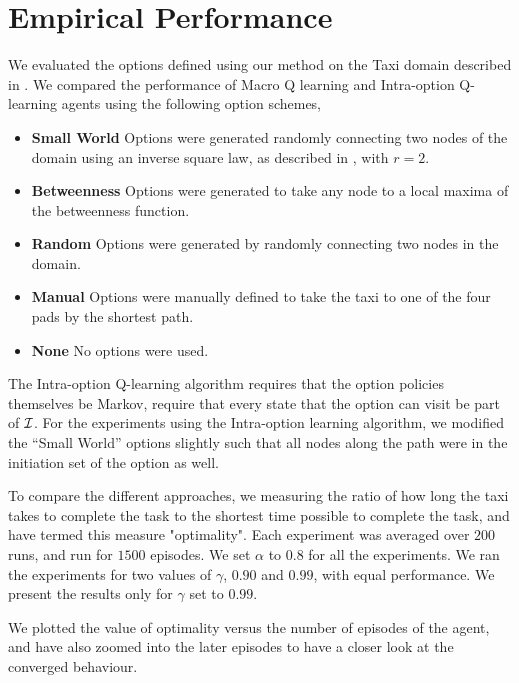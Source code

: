 \section{Empirical Performance}
\label{sec:experiments}

We evaluated the options defined using our method on the Taxi domain described
in . We compared the performance of Macro Q learning and
Intra-option Q-learning agents using the following option schemes,
\begin{itemize}
   \item \textbf{Small World} Options were generated randomly connecting two nodes of
       the domain using an inverse square law, as described in
       , with $r = 2$.
   \item \textbf{Betweenness} Options were generated to take any node to a local maxima
       of the betweenness function.
   \item \textbf{Random} Options were generated by randomly connecting two nodes in the
       domain.
   \item \textbf{Manual} Options were manually defined to take the taxi to one of the
       four pads by the shortest path.
   \item \textbf{None} No options were used.
\end{itemize}

The Intra-option Q-learning algorithm requires that the option policies
themselves be Markov, require that every state that the option can visit be part
of $\mathcal{I}$. For the experiments using the Intra-option learning algorithm, we
modified the ``Small World'' options slightly such that all nodes along the path
were in the initiation set of the option as well.

To compare the different approaches, we measuring the ratio of how long the taxi
takes to complete the task to the shortest time possible to complete the task,
and have termed this measure "optimality".  Each experiment was averaged over
$200$ runs, and run for $1500$ episodes. We set $\alpha$ to $0.8$ for all the
experiments. We ran the experiments for two values of $\gamma$, $0.90$ and
$0.99$, with equal performance. We present the results only for $\gamma$ set to
$0.99$.

We plotted the value of optimality versus the number of episodes of the agent,
and have also zoomed into the later episodes to have a closer look at the
converged behaviour.

